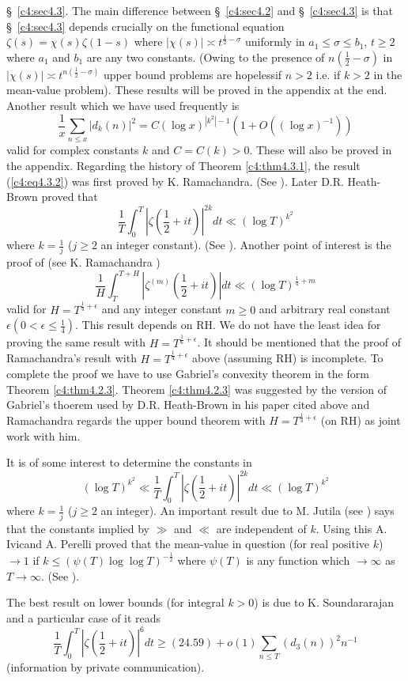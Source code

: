 \S\ \ref{c4:sec4.3}. The main difference between \S\ \ref{c4:sec4.2} and \S\ \ref{c4:sec4.3} is that \S\ \ref{c4:sec4.3} depends crucially on the functional equation $\zeta(s) = \chi(s) \zeta(1-s)$ where $|\chi(s)| \asymp t^{\frac{1}{2} -\sigma}$ uniformly in $a_1 \leq \sigma \leq b_1$, $t \geq 2$ where $a_1$ and $b_1$ are any two constants. (Owing to the presence of $n(\frac{1}{2} - \sigma)$ in $|\chi(s)|\asymp t^{n(\frac{1}{2} - \sigma)}$ upper bound problems are hopeless\pageoriginale if $n>2$ i.e. if $k >2$ in the mean-value problem). These results will be proved in the appendix at the end. Another result which we have used frequently is 
$$
 \frac{1}{x} \sum\limits_{n \leq x} |d_k(n)|^2 = C(\log x)^{|k^2| -1} (1+O((\log x)^{-1}))
$$
valid for complex constants $k$ and $C = C(k) > 0$. These will also be proved in the appendix. Regarding the history of Theorem \ref{c4:thm4.3.1}, the result (\ref{c4:eq4.3.2}) was first proved by K. Ramachandra. (See \cite{Ramachandra17}). Later D.R. Heath-Brown proved that 
$$
\frac{1}{T} \int^T_0 |\zeta \left(\frac{1}{2} + it \right)|^{2k} dt \ll (\log T)^{k^2}
$$
where $k =\frac{1}{j} $ ($ j \geq 2$ an integer constant). (See \cite{Heath-Brown1}). Another point of interest is the proof of (see K. Ramachandra \cite{Ramachandra17})
$$
\frac{1}{H}  \int^{T+H}_T |\zeta^{(m)} \left(\frac{1}{2} + it \right)| dt \ll (\log T)^{\frac{1}{4} + m}
$$
valid for $H = T^{\frac{1}{4} + \epsilon}$ and any integer constant $m\geq 0$ and arbitrary real constant $\epsilon (0 < \epsilon \leq \frac{1}{4})$. This result depends on RH. We do not have the least idea for proving the  same result with $H = T^{\frac{1}{6} + \epsilon}$. It should  be mentioned that the proof of Ramachandra's result with $H = T^{\frac{1}{4} + \epsilon}$ above  (assuming RH) is incomplete. To complete the proof we have to use Gabriel's convexity theorem in the form Theorem \ref{c4:thm4.2.3}. Theorem \ref{c4:thm4.2.3} was suggested by the version of Gabriel's thoerem used by D.R. Heath-Brown in his paper cited above and Ramachandra regards the upper bound theorem with $H = T^{\frac{1}{4} + \epsilon}$ (on RH) as joint work with him.

It is of some interest to determine the constants in 
$$
(\log T)^{k^2} \ll \frac{1}{T} \int^T_0 |\zeta \left(\frac{1}{2} + it \right)|^{2k} dt \ll (\log T)^{k^2} 
$$ 
where $k = \frac{1}{j}$ ($j \geq 2$ an integer). An important result due to M. Jutila (see \cite{Jutila2}) says that the constants implied by $\gg$ and $\ll$ are independent of $k$. Using this A. Ivic\pageoriginale and A. Perelli proved that the mean-value in question (for real positive $k$) $\to 1$ if $k \leq (\psi (T) \log \log T)^{-\frac{1}{2}}$ where $\psi (T)$ is any function which $\to \infty$ as $T \to \infty$. (See \cite{Ivic and  Perelli1}).

The best result on lower bounds (for integral $k>0$) is due to K. Soundararajan and a particular case of it reads 
$$
\frac{1}{T} \int^T_0 |\zeta \left(\frac{1}{2} + it \right)|^6 dt \geq (24.59) + o(1) \sum\limits_{n\leq T} (d_3(n))^2 n^{-1}
$$
(information by private communication).


